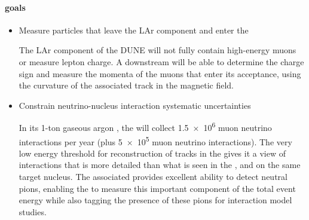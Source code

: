 \paragraph{ goals}
\begin{itemize}

\item {Measure particles that leave the LAr  component and enter the  
    
The LAr component of the DUNE  will not fully contain high-energy muons or measure lepton charge.  A downstream  will be able to determine the charge sign and measure the momenta of the muons that enter its acceptance, using the curvature of the associated track in the magnetic field. } 


    \item {Constrain neutrino-nucleus interaction systematic uncertainties

%
In its 1-ton gaseous argon , the  will collect \num{1.5e6}  muon neutrino interactions per year (plus \num{5e5}  muon neutrino interactions). The very low energy threshold for reconstruction of tracks in the  gives it a view of interactions that is more detailed than what is seen in the , and on the same target nucleus. The associated  provides excellent ability to detect neutral pions, enabling the  to measure this important component of the total event energy while also tagging the presence of these pions for interaction model studies.


}
\end{itemize}
